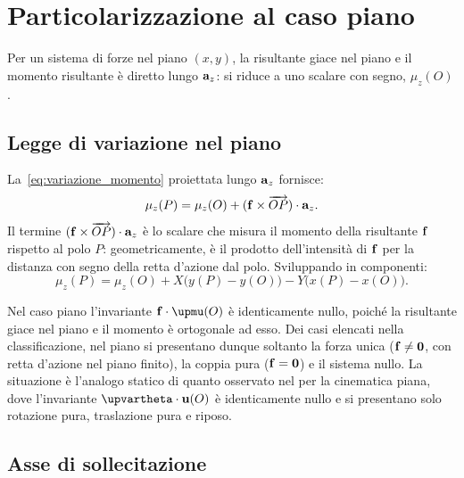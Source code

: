 \section{Particolarizzazione al caso piano}	\label{sec:caso_piano_F}

Per un sistema di forze nel piano $(x,y)$, la risultante
giace nel piano e il momento risultante è diretto lungo
$\mathbf{a}_z$: si riduce a uno scalare con segno, $\mu_z(O)$.

\subsection{Legge di variazione nel piano}

La~\eqref{eq:variazione_momento} proiettata lungo $\mathbf{a}_z$
fornisce:
\begin{equation}\label{eq:variazione_piano_vett}
	\mu_z(P) = \mu_z(O)
	+ (\mathbf{f} \times \overrightarrow{OP}) \cdot \mathbf{a}_z.
\end{equation}
Il termine
$(\mathbf{f} \times \overrightarrow{OP}) \cdot \mathbf{a}_z$ è lo scalare
che misura il momento della risultante $\mathbf{f}$ rispetto al polo
$P$: geometricamente, è il prodotto dell'intensità di $\mathbf{f}$
per la distanza con segno della retta d'azione dal polo.
Sviluppando in componenti:
\begin{equation}\label{eq:variazione_piano}
	\mu_z(P) = \mu_z(O)
	+ X\bigl(y(P)-y(O)\bigr)
	- Y\bigl(x(P)-x(O)\bigr).
\end{equation}



\begin{oss}
	Nel caso piano l'invariante
	$\fb \cdot \bm{\upmu}(O)$ è identicamente nullo, poiché
	la risultante giace nel piano e il momento è ortogonale ad
	esso. Dei casi elencati nella classificazione, nel piano si
	presentano dunque soltanto la forza unica
	($\mathbf{f} \neq \mathbf{0}$, con retta d'azione nel piano finito),
	la coppia pura ($\mathbf{f} = \mathbf{0}$) e il sistema nullo. La
	situazione è l'analogo statico di quanto osservato nel   per la cinematica piana, dove l'invariante
	$\bm{\upvartheta} \cdot \ub(O)$ è identicamente nullo e si
	presentano solo rotazione pura, traslazione pura e riposo.
\end{oss}

\subsection{Asse di sollecitazione}\label{sec:asse_soll}

